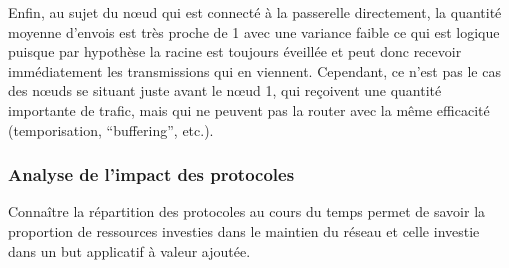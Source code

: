 Enfin, au sujet du nœud qui est connecté à la passerelle directement, la quantité moyenne d'envois est très proche de 1 avec une variance faible ce qui est logique puisque par hypothèse la racine est toujours éveillée et peut donc recevoir immédiatement les transmissions qui en viennent.
Cependant, ce n'est pas le cas des nœuds se situant juste avant le nœud 1, qui reçoivent une quantité importante de trafic, mais qui ne peuvent pas la router avec la même efficacité (temporisation, ``buffering'', etc.).

\subsubsection{Analyse de l'impact des protocoles}
\label{supervision:protocols_analysis}

Connaître la répartition des protocoles au cours du temps permet de savoir la proportion de ressources investies dans le maintien du réseau et celle investie dans un but applicatif à valeur ajoutée.

